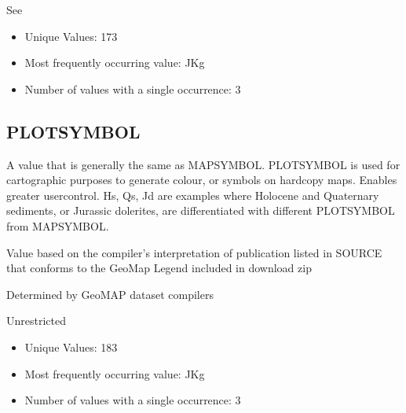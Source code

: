 \documentclass[letterpaper,10pt,english]{sphinxmanual}
\begin{document}

See {\hyperref[\detokenize{legend::doc}]{}}

\begin{itemize}
\item {} 
Unique Values: 173

\item {} 
Most frequently occurring value: JKg

\item {} 
Number of values with a single occurrence: 3

\end{itemize}


\subsection{PLOTSYMBOL}
\label{\detokenize{field_glossary:plotsymbol}}
A value that is generally the same as MAPSYMBOL.  PLOTSYMBOL is used for cartographic purposes to generate colour, or symbols on hard\sphinxhyphen{}copy maps. Enables greater user\sphinxhyphen{}control. Hs, Qs, Jd are examples where Holocene and Quaternary sediments, or Jurassic dolerites, are differentiated with different PLOTSYMBOL from MAPSYMBOL.

Value based on the compiler’s interpretation of publication listed in SOURCE that conforms to the GeoMap Legend included in download zip

Determined by GeoMAP dataset compilers


Unrestricted

\begin{itemize}
\item {} 
Unique Values: 183

\item {} 
Most frequently occurring value: JKg

\item {} 
Number of values with a single occurrence: 3

\end{itemize}
\end{document}
